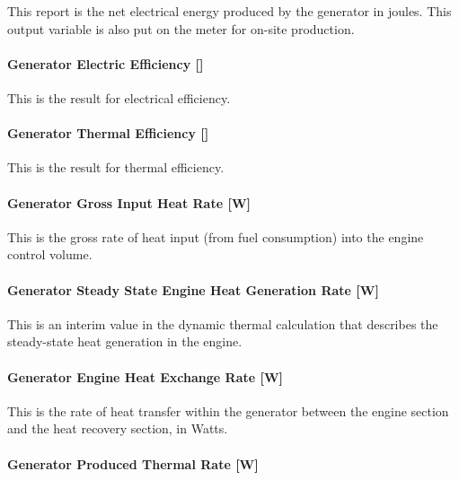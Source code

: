 This report is the net electrical energy produced by the generator in joules. This output variable is also put on the meter for on-site production.

\paragraph{\texorpdfstring{Generator Electric Efficiency {[]}}{Generator Electric Efficiency }}\label{generator-electric-efficiency}

This is the result for electrical efficiency.

\paragraph{\texorpdfstring{Generator Thermal Efficiency {[]}}{Generator Thermal Efficiency }}\label{generator-thermal-efficiency}

This is the result for thermal efficiency.

\paragraph{Generator Gross Input Heat Rate {[}W{]}}\label{generator-gross-input-heat-rate-w}

This is the gross rate of heat input (from fuel consumption) into the engine control volume.

\paragraph{Generator Steady State Engine Heat Generation Rate {[}W{]}}\label{generator-steady-state-engine-heat-generation-rate-w}

This is an interim value in the dynamic thermal calculation that describes the steady-state heat generation in the engine.

\paragraph{Generator Engine Heat Exchange Rate {[}W{]}}\label{generator-engine-heat-exchange-rate-w}

This is the rate of heat transfer within the generator between the engine section and the heat recovery section, in Watts.

\paragraph{Generator Produced Thermal Rate {[}W{]}}\label{generator-produced-thermal-rate-w-2}

